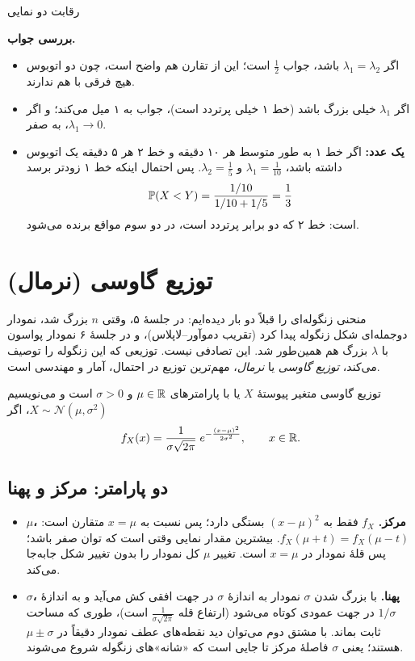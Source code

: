 \begin{example}[label=ex:race]{رقابت دو نمایی}
\begin{solution}
\textbf{بررسی جواب.}
\begin{itemize}
  \item اگر $\lambda_1=\lambda_2$ باشد، جواب $\tfrac12$ است؛ این از تقارن هم واضح است، چون دو اتوبوس هیچ فرقی با هم ندارند.
  \item اگر $\lambda_1$ خیلی بزرگ باشد (خط ۱ خیلی پرتردد است)، جواب به ۱ میل می‌کند؛ و اگر $\lambda_1\to0$، به صفر.
  \item \textbf{یک عدد:} اگر خط ۱ به طور متوسط هر ۱۰ دقیقه و خط ۲ هر ۵ دقیقه یک اتوبوس داشته باشد، $\lambda_1=\tfrac1{10}$ و $\lambda_2=\tfrac15$. پس احتمال اینکه خط ۱ زودتر برسد
  \[ \P(X<Y)=\frac{1/10}{1/10+1/5}=\frac13 \]
  است: خط ۲ که دو برابر پرتردد است، در دو سوم مواقع برنده می‌شود.
\end{itemize}


\end{solution}
\end{example}

\section{توزیع گاوسی (نرمال)}
\label{sec:gauss}

منحنی زنگوله‌ای را قبلاً دو بار دیده‌ایم: در جلسهٔ ۵، وقتی $n$ بزرگ شد، نمودار دوجمله‌ای شکل زنگوله پیدا کرد (تقریب دموآور--لاپلاس)، و در جلسهٔ ۶ نمودار پواسون با $\lambda$ بزرگ هم همین‌طور شد. این تصادفی نیست. توزیعی که این زنگوله را توصیف می‌کند، \emph{توزیع گاوسی} یا \emph{نرمال}، مهم‌ترین توزیع در احتمال، آمار و مهندسی است.

\begin{definition}[label=def:gauss]{توزیع گاوسی}
متغیر پیوستهٔ $X$  یا  با پارامترهای $\mu\in\R$ و $\sigma>0$ است و می‌نویسیم $X\sim\mathcal N(\mu,\sigma^2)$، اگر
\[ f_X(x)=\frac{1}{\sigma\sqrt{2\pi}}\;e^{-\frac{(x-\mu)^2}{2\sigma^2}},\qquad x\in\R. \]
\end{definition}

\subsection{دو پارامتر: مرکز و پهنا}

\begin{itemize}
  \item \textbf{$\mu$، مرکز.} $f_X$ فقط به $(x-\mu)^2$ بستگی دارد؛ پس نسبت به $x=\mu$ متقارن است: $f_X(\mu+t)=f_X(\mu-t)$. بیشترین مقدار نمایی وقتی است که توان صفر باشد؛ پس قلهٔ نمودار در $x=\mu$ است. تغییر $\mu$ کل نمودار را بدون تغییر شکل جابه‌جا می‌کند.
  \item \textbf{$\sigma$، پهنا.} با بزرگ شدن $\sigma$ نمودار به اندازهٔ $\sigma$ در جهت افقی کش می‌آید و به اندازهٔ $1/\sigma$ در جهت عمودی کوتاه می‌شود (ارتفاع قله $\frac{1}{\sigma\sqrt{2\pi}}$ است)، طوری که مساحت ثابت بماند. با مشتق دوم می‌توان دید نقطه‌های عطف نمودار دقیقاً در $\mu\pm\sigma$ هستند؛ یعنی $\sigma$ فاصلهٔ مرکز تا جایی است که «شانه»های زنگوله شروع می‌شوند.
\end{itemize}

